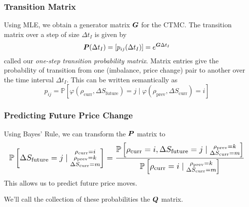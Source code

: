 \begin{frame}
\frametitle{Transition Matrix}
Using MLE, we obtain a generator matrix $\boldsymbol{G}$ for the CTMC. The transition matrix over a step of size $\Delta t_I$ is given by
\[ \boldsymbol{P}(\Delta t_I) = [p_{ij}(\Delta t_I)] = e^{\boldsymbol{G} \Delta t_I} \]
called our \emph{one-step transition probability matrix}. Matrix entries give the probability of transition from one (imbalance, price change) pair to another over the time interval $\Delta t_I$. This can be written semantically as
\[ p_{ij} = \mathbb{P}\left[ \varphi( \rho_\text{curr}, \Delta S_\text{future}) = j \; | \; \varphi( \rho_\text{prev}, \Delta S_\text{curr} ) = i \right] \]
\end{frame}

\begin{frame}
\frametitle{Predicting Future Price Change}
Using Bayes' Rule, we can transform the $\boldsymbol{P}$ matrix to 
\[
\resizebox{\textwidth}{!}{$\displaystyle
\mathbb{P}\left[ \Delta S_\text{future} = j \; | \; \substack{
\rho_\text{curr} = i \\
\rho_\text{prev} = k\\
\Delta S_\text{curr} = m} \right] = \dfrac{\mathbb{P}\left[ \rho_\text{curr} = i, \Delta S_\text{future} = j \; | \; \substack{
\rho_\text{prev} = k\\
\Delta S_\text{curr} = m} \right]}{\mathbb{P}\left[ \rho_\text{curr} = i \; | \; \substack{
\rho_\text{prev} = k\\
\Delta S_\text{curr} = m} \right]}
$}
\]
This allows us to predict future price moves.\par
\vspace{\baselineskip}
We'll call the collection of these probabilities the $\boldsymbol{Q}$ matrix.
\end{frame}

